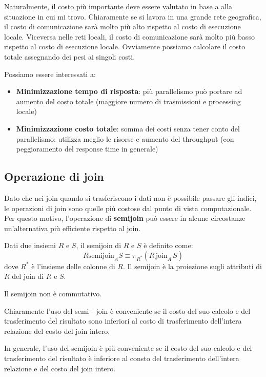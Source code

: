Naturalmente, il costo più importante deve essere valutato in base a alla
situazione in cui mi trovo. Chiaramente se si lavora in una grande rete
geografica, il costo di comunicazione sarà molto più alto rispetto al costo di
esecuzione locale. Viceversa nelle reti locali, il costo di comunicazione sarà
molto più basso rispetto al costo di esecuzione locale. Ovviamente possiamo calcolare
il costo totale assegnando dei pesi ai singoli costi.

Possiamo essere interessati a:
\begin{itemize}
      \item \textbf{Minimizzazione tempo di risposta}: più parallelismo può portare ad
            aumento del costo totale (maggiore numero di trasmissioni e
            processing locale)
      \item \textbf{Minimizzazione costo totale}: somma dei costi senza tener conto del
            parallelismo: utilizza meglio le risorse e aumento del throughput (con
            peggioramento del response time in generale)
\end{itemize}
\subsection{Operazione di join}
Dato che nei join quando si trasferiscono i dati non è possibile passare gli indici,
le operazioni di join sono quelle più costose dal punto di vista computazionale.
Per questo motivo, l'operazione di \textbf{semijoin} può essere in alcune circostanze
un'alternativa più efficiente rispetto al join.
\begin{definizione}
      Dati due insiemi $R$ e $S$, il semijoin di $R$ e $S$ è definito come:
      \begin{equation*}
            R \text{semijoin}_A S \equiv \pi_{R^\ast}(R \, \text{join}_A \, S)
      \end{equation*}
      dove $R^\ast$ è l'insieme delle colonne di $R$. Il semijoin è la proiezione
      sugli attributi di $R$ del join di $R$ e $S$.
\end{definizione}
\begin{nota}
      Il semijoin non è commutativo.
\end{nota}
Chiaramente l'uso del semi - join è conveniente se il costo del suo calcolo e
del trasferimento del risultato sono inferiori al costo di trasferimento
dell'intera relazione del costo del join intero.

In generale, l'uso del semijoin è più conveniente se il costo del suo calcolo e
del trasferimento del risultato è inferiore al consto del trasferimento
dell'intera relazione e del costo del join intero.
